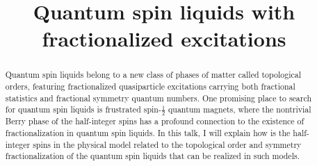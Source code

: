 \documentclass[12pt]{article}
\begin{document}
\title{Quantum spin liquids with fractionalized excitations}
\begin{abstract}
Quantum spin liquids belong to a new class of phases of matter called topological orders, featuring fractionalized quasiparticle excitations carrying both fractional statistics and fractional symmetry quantum numbers.
One promising place to search for quantum spin liquids is frustrated spin-$\frac12$ quantum magnets, where the nontrivial Berry phase of the half-integer spins has a profound connection to the existence of fractionalization in quantum spin liquids.
In this talk, I will explain how is the half-integer spins in the physical model related to the topological order and symmetry fractionalization of the quantum spin liquids that can be realized in such models. 
\end{abstract}
\end{document}
